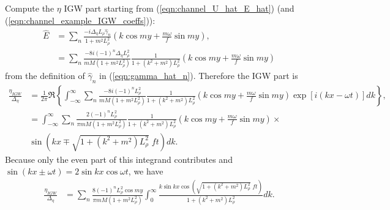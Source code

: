 \documentclass[10pt,reqno]{amsart}
\begin{document}
Compute the $\eta$ IGW part starting from (\ref{eqn:channel_U_hat_E_hat}) (and (\ref{eqn:channel_example_IGW_coeffs})):
\begin{align}
\hat{E} & = \sum_n \frac{- i \Delta_\eta L_\rho \hat{\gamma}_n}{1 + m^2 L_\rho^2} \left( k \cos m y  + \frac{m \omega}{f} \sin m y  \right)
, \\
& = \sum_n \frac{- 8 i {\left(-1\right)}^n \Delta _{\eta } L_\rho^2}{m M \left( 1 + m^2 L_\rho^2 \right)}  \frac{ 1}{ 1 + \left( k^2 + m^2\right) L_\rho^2 } \left( k \cos m y  + \frac{m \omega}{f} \sin m y  \right)
\label{eqn:channel_eg_E_h}
\end{align}
from the definition of $\hat{\gamma}_n$ in (\ref{eqn:gamma_hat_n}).
Therefore the IGW part is
\begin{align}
\frac{\eta_{IGW}}{\Delta_\eta} & = \frac{1}{2 \pi} \Re \left\{  \int_{- \infty}^{\infty} \sum_n \frac{-8 i {\left(-1\right)}^n  L_\rho^2}{ m M \left( 1 + m^2 L_\rho^2 \right)}  \frac{ 1}{ 1 + \left( k^2 + m^2\right) L_\rho^2 } \left( k \cos m y  + \frac{m \omega}{f} \sin m y  \right) \exp \left[ i \left(k x - \omega t\right) \right] dk \right\} , \\
& = \int_{- \infty}^{\infty} \sum_n \frac{2 {\left(-1\right)}^{n} L_\rho^2}{\pi m M \left( 1 + m^2 L_\rho^2 \right)}  \frac{ 1}{ 1 + \left( k^2 + m^2\right) L_\rho^2 } \left( k \cos m y  + \frac{m \omega}{f} \sin m y  \right) \times \nonumber \\
& \sin \left( k x \mp \sqrt{1 + \left( k^2 + m^2\right) L_\rho^2 } \; f t\right) dk  .
\label{eqn:channel_eg_eta_IGW_intermediate}
\end{align}
Because only the even part of this integrand contributes and $\sin \left( kx \pm \omega t \right) = 2 \sin kx \cos \omega t$, we have
\begin{align}
\frac{\eta_{IGW}}{\Delta_\eta} & = \sum_n \frac{8 {\left(-1\right)}^n L_\rho^2 \cos m y}{\pi m M \left( 1 + m^2 L_\rho^2 \right)} \int_{0}^{\infty} \frac{ k \sin  k x  \cos \left( \sqrt{1 + \left( k^2 + m^2\right) L_\rho^2 } \; f t\right)}{ 1 + \left( k^2 + m^2\right) L_\rho^2 }  dk  .
\label{eqn:channel_eg_eta_IGW}
\end{align}
\end{document}
